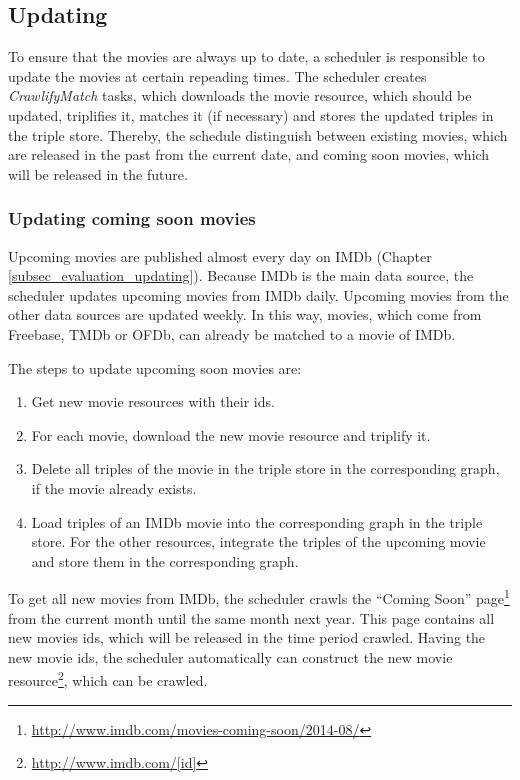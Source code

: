 \subsection{Updating}
\label{subsec_method_updating}

To ensure that the movies are always up to date, a scheduler is responsible to update the movies at certain repeading times.
The scheduler creates \textit{CrawlifyMatch} tasks, which downloads the movie resource, which should be updated, triplifies it, matches it (if necessary) and stores the updated triples in the triple store.
Thereby, the schedule distinguish between existing movies, which are released in the past from the current date, and coming soon movies, which will be released in the future.

\subsubsection{Updating coming soon movies}
Upcoming movies are published almost every day on IMDb (Chapter \ref{subsec_evaluation_updating}).
Because IMDb is the main data source, the scheduler updates upcoming movies from IMDb daily.
Upcoming movies from the other data sources are updated weekly.
In this way, movies, which come from Freebase, TMDb or OFDb, can already be matched to a movie of IMDb.

The steps to update upcoming soon movies are:
\begin {enumerate}
	\item Get new movie resources with their ids.
	\item For each movie, download the new movie resource and triplify it.
	\item Delete all triples of the movie in the triple store in the corresponding graph, if the movie already exists.
	\item Load triples of an IMDb movie into the corresponding graph in the triple store. For the other resources, integrate the triples of the upcoming movie and store them in the corresponding graph.
\end{enumerate}

To get all new movies from IMDb, the scheduler crawls the "`Coming Soon"' page\footnote{\url{http://www.imdb.com/movies-coming-soon/2014-08/}} from the current month until the same month next year.
This page contains all new movies ids, which will be released in the time period crawled.
Having the new movie ids, the scheduler automatically can construct the new movie resource\footnote{\url{http://www.imdb.com/[id]}}, which can be crawled.


